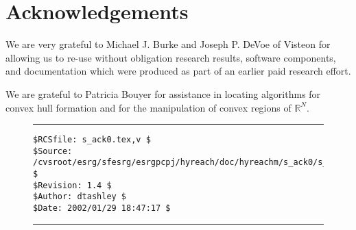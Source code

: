 %
\section{Acknowledgements}
\label{sack0}

We are very grateful to Michael J. Burke \cite{bib:i:mburke:visteon}
and Joseph P. DeVoe \cite{bib:i:jdevoe:visteon} of Visteon
for allowing us to re-use without obligation research results,
software components, and documentation which were produced as part
of an earlier paid research effort.

We are grateful to Patricia Bouyer \cite{bib:i:patriciabouyer}
for assistance in locating algorithms for convex hull formation and for
the manipulation of convex regions of $\mathbb{R}^N$.

\noindent\begin{figure}[!b]
\noindent\rule[-0.25in]{\textwidth}{1pt}
\begin{tiny}
\begin{verbatim}
$RCSfile: s_ack0.tex,v $
$Source: /cvsroot/esrg/sfesrg/esrgpcpj/hyreach/doc/hyreachm/s_ack0/s_ack0.tex,v $
$Revision: 1.4 $
$Author: dtashley $
$Date: 2002/01/29 18:47:17 $
\end{verbatim}
\end{tiny}
\noindent\rule[0.25in]{\textwidth}{1pt}
\end{figure}
%
%
%
